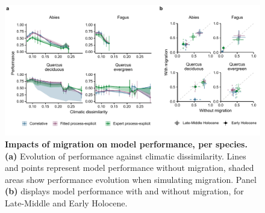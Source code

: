 \begin{figure}
\hspace*{-0.8in}
\centering
\includegraphics{chapter2/figs/supp/figS9_performance_perspecies-1.pdf}
\caption{\textbf{Impacts of migration on model performance, per species.} \textbf{(a)} Evolution of performance against climatic dissimilarity. Lines and points represent model performance without migration, shaded areas show performance evolution when simulating migration. Panel \textbf{(b)} displays model performance with and without migration, for Late-Middle and Early Holocene.}
\label{fig:S9}
\end{figure}


